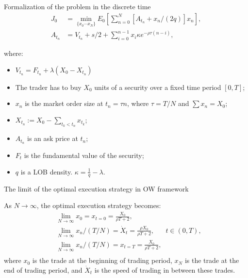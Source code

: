 \documentclass[aspectratio=169]{beamer}
\begin{document}
\begin{frame}{Formalization of the problem in the discrete time}
    \begin{align} \label{optexp}
        J_0 &= \min _{\{x_0 \cdots x_N \}} E_0 \left[ \sum _{n=0}^N [A_{t_n} + x_n /(2q)] x_n\right], \\ 
        A_{t_n} &= V_{t_n} + s/2 + \sum _{i=0}^{n-1} x_i \kappa e^{- \rho \tau (n - i)},
     \end{align}
     
    where:
    \begin{itemize}
     \item $V_{t_n} = F_{t_n} + \lambda (X_0 - X_{t_n})$
     \item The trader has to buy $X_0$ units of a security over a fixed time period $[0,T]$; 
     \item $x_{n}$ 
     is the market order size at $t_n = \tau n$, where $\tau = T / N$ and $\sum x_n = X_0$;
     \item $X_{t_n} := X_0 - \sum _{t_k < t_n} x_{t_k}$;
     \item $A_{t_n}$ is an ask price at $t_n$; 
     \item $F_t$ is the fundamental value of the security;
     \item $q$ is a LOB density. $\kappa = \frac{1}{q} - \lambda $.
    \end{itemize}

\end{frame}


\begin{frame}{The limit of the optimal execution strategy in OW framework}
    
    \begin{theorem}
        As $N \rightarrow \infty$, the optimal execution strategy becomes:
        \begin{align*}
            & \lim _{N \rightarrow \infty} x_0 = x_{t = 0} = \frac{X_0}{\rho T + 2}, \\
            & \lim _{N \rightarrow \infty} x_n / (T/N) = \dot X _t = \frac{\rho X_0}{\rho T + 2}, \;\;\;\;\;\; t \in (0, T), \\
            & \lim _{N \rightarrow \infty} x_n / (T/N) = x_{t=T}=  \frac{X_0}{\rho T + 2},  \\
        \end{align*}
        where $x_0$ is the trade at the beginning of trading period, $x_N$ is the trade at the end of trading
        period, and $\dot X _t$ is the speed of trading in between these trades.
    \end{theorem}

\end{frame}
\end{document}
